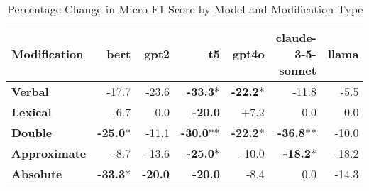 \begin{table}[h]
\centering
\begin{tabular}{lrrrrrr}
\hline
Modification & \textbf{bert} & \textbf{gpt2} & \textbf{t5} & \textbf{gpt4o} & \textbf{claude-3-5-sonnet} & \textbf{llama} \\
\hline
\textbf{Verbal} & \cellcolor{red!30} -17.7 & \cellcolor{red!30} -23.6 & \cellcolor{red!30} \textbf{-33.3}* & \cellcolor{red!30} \textbf{-22.2}* & \cellcolor{red!30} -11.8 & \cellcolor{red!16} -5.5 \\
\hline
\textbf{Lexical} & \cellcolor{red!20} -6.7 & \cellcolor{red!0} 0.0 & \cellcolor{red!30} \textbf{-20.0} & \cellcolor{green!21} +7.2 & \cellcolor{red!0} 0.0 & \cellcolor{red!0} 0.0 \\
\hline
\textbf{Double} & \cellcolor{red!30} \textbf{-25.0}* & \cellcolor{red!30} -11.1 & \cellcolor{red!30} \textbf{-30.0}** & \cellcolor{red!30} \textbf{-22.2}* & \cellcolor{red!30} \textbf{-36.8}** & \cellcolor{red!30} -10.0 \\
\hline
\textbf{Approximate} & \cellcolor{red!26} -8.7 & \cellcolor{red!30} -13.6 & \cellcolor{red!30} \textbf{-25.0}* & \cellcolor{red!30} -10.0 & \cellcolor{red!30} \textbf{-18.2}* & \cellcolor{red!30} -18.2 \\
\textbf{Absolute} & \cellcolor{red!30} \textbf{-33.3}* & \cellcolor{red!30} \textbf{-20.0} & \cellcolor{red!30} \textbf{-20.0} & \cellcolor{red!25} -8.4 & \cellcolor{red!0} 0.0 & \cellcolor{red!30} -14.3 \\
\hline
\end{tabular}
\caption{Percentage Change in Micro F1 Score by Model and Modification Type}
\label{tab:ner_results}
\end{table}